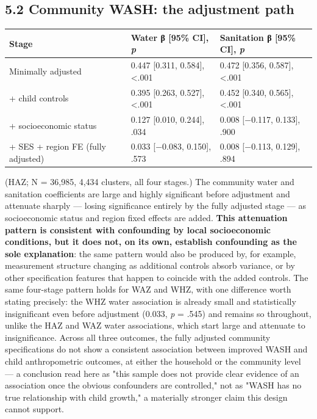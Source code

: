 \subsection*{5.2 Community WASH: the adjustment path}

\begingroup\fontsize{10}{15}\selectfont
\begin{longtable}{lll}
\toprule
Stage & Water β [95\% CI], \textit{p} & Sanitation β [95\% CI], \textit{p} \\
\midrule
\endhead
Minimally adjusted & 0.447 [0.311, 0.584], <.001 & 0.472 [0.356, 0.587], <.001 \\
+ child controls & 0.395 [0.263, 0.527], <.001 & 0.452 [0.340, 0.565], <.001 \\
+ socioeconomic status & 0.127 [0.010, 0.244], .034 & 0.008 [−0.117, 0.133], .900 \\
+ SES + region FE (fully adjusted) & 0.033 [−0.083, 0.150], .573 & 0.008 [−0.113, 0.129], .894 \\
\bottomrule
\end{longtable}
\endgroup

(HAZ; N = 36,985, 4,434 clusters, all four stages.) The community water and sanitation coefficients are large and highly significant before adjustment and attenuate sharply --- losing significance entirely by the fully adjusted stage --- as socioeconomic status and region fixed effects are added. \textbf{This attenuation pattern is consistent with confounding by local socioeconomic conditions, but it does not, on its own, establish confounding as the sole explanation}: the same pattern would also be produced by, for example, measurement structure changing as additional controls absorb variance, or by other specification features that happen to coincide with the added controls. The same four-stage pattern holds for WAZ and WHZ, with one difference worth stating precisely: the WHZ water association is already small and statistically insignificant even before adjustment (0.033, \textit{p} = .545) and remains so throughout, unlike the HAZ and WAZ water associations, which start large and attenuate to insignificance. Across all three outcomes, the fully adjusted community specifications do not show a consistent association between improved WASH and child anthropometric outcomes, at either the household or the community level --- a conclusion read here as "this sample does not provide clear evidence of an association once the obvious confounders are controlled," not as "WASH has no true relationship with child growth," a materially stronger claim this design cannot support.

